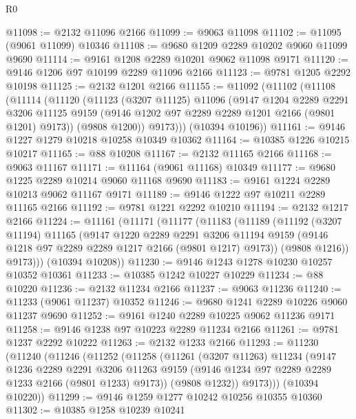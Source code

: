 \begin{lexlean}{R0}
\begin{coremodule}
@11098 := @2132 @11096 @2166
@11099 := @9063 @11098
@11102 := @11095 (@9061 @11099) @10346
@11108 := @9680 @1209 @2289 @10202 @9060 @11099 @9690
@11114 := @9161 @1208 @2289 @10201 @9062 @11098 @9171
@11120 := @9146 @1206 @97 @10199 @2289 @11096 @2166
@11123 := @9781 @1205 @2292 @10198
@11125 := @2132 @1201 @2166
@11155 := @11092
    (@11102
      (@11108
        (@11114
          (@11120
            (@11123
              (@3207 @11125)
              @11096
              (@9147
                @1204
                @2289
                @2291
                @3206
                @11125
                @9159
                (@9146 @1202 @97 @2289 @2289 @1201 @2166 (@9801 @1201) @9173))
              (@9808 @1200))
            @9173)))
      (@10394 @10196))
@11161 := @9146 @1227 @1279 @10218 @10258 @10349 @10362
@11164 := @10385 @1226 @10215 @10217
@11165 := @88 @10208
@11167 := @2132 @11165 @2166
@11168 := @9063 @11167
@11171 := @11164 (@9061 @11168) @10349
@11177 := @9680 @1225 @2289 @10214 @9060 @11168 @9690
@11183 := @9161 @1224 @2289 @10213 @9062 @11167 @9171
@11189 := @9146 @1222 @97 @10211 @2289 @11165 @2166
@11192 := @9781 @1221 @2292 @10210
@11194 := @2132 @1217 @2166
@11224 := @11161
    (@11171
      (@11177
        (@11183
          (@11189
            (@11192
              (@3207 @11194)
              @11165
              (@9147
                @1220
                @2289
                @2291
                @3206
                @11194
                @9159
                (@9146 @1218 @97 @2289 @2289 @1217 @2166 (@9801 @1217) @9173))
              (@9808 @1216))
            @9173)))
      (@10394 @10208))
@11230 := @9146 @1243 @1278 @10230 @10257 @10352 @10361
@11233 := @10385 @1242 @10227 @10229
@11234 := @88 @10220
@11236 := @2132 @11234 @2166
@11237 := @9063 @11236
@11240 := @11233 (@9061 @11237) @10352
@11246 := @9680 @1241 @2289 @10226 @9060 @11237 @9690
@11252 := @9161 @1240 @2289 @10225 @9062 @11236 @9171
@11258 := @9146 @1238 @97 @10223 @2289 @11234 @2166
@11261 := @9781 @1237 @2292 @10222
@11263 := @2132 @1233 @2166
@11293 := @11230
    (@11240
      (@11246
        (@11252
          (@11258
            (@11261
              (@3207 @11263)
              @11234
              (@9147
                @1236
                @2289
                @2291
                @3206
                @11263
                @9159
                (@9146 @1234 @97 @2289 @2289 @1233 @2166 (@9801 @1233) @9173))
              (@9808 @1232))
            @9173)))
      (@10394 @10220))
@11299 := @9146 @1259 @1277 @10242 @10256 @10355 @10360
@11302 := @10385 @1258 @10239 @10241

\end{coremodule}
\end{lexlean}
